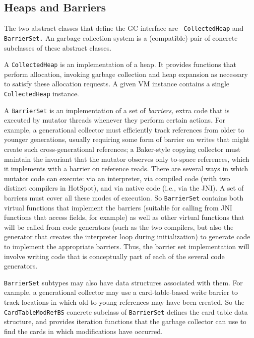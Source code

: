 \documentclass{article}
\begin{document}
\subsection{Heaps and Barriers}

The two abstract classes that define the GC interface are {\tt
CollectedHeap} and {\tt BarrierSet.}
An garbage collection system is a (compatible) pair of concrete
subclasses of these abstract classes. 

A {\tt CollectedHeap} is an implementation of a heap.  It provides
functions that perform allocation, invoking garbage collection and
heap expansion as necessary to satisfy these allocation requests.  A
given VM instance contains a single {\tt CollectedHeap} instance.

A {\tt BarrierSet} is an implementation of a set of {\em barriers,}
extra code that is executed by mutator threads whenever they perform
certain actions.  For example, a generational collector must
efficiently track references from older to younger generations, usually
requiring some form of barrier on writes that
might create such cross-generational references; a Baker-style copying
collector must maintain 
the invariant that the mutator observes only to-space references, which
it implements with a barrier on reference reads.  There are several ways
in which mutator code can execute: via an interpreter, via compiled
code (with two distinct compilers in HotSpot), and via native code
(i.e., via the JNI).  A set of barriers must cover all these modes of
execution.  So {\tt BarrierSet} contains both virtual functions that
implement the barriers (suitable for calling from JNI functions that
access fields, for example) as well as other virtual functions that
will be called from code generators (such as the two compilers, but
also the generator that creates the interpreter loop during
initialization) to generate code to implement the appropriate
barriers.  Thus, the barrier set implementation will involve writing
code that is conceptually part of each of the several code
generators.

{\tt BarrierSet} subtypes may also have data structures associated
with them.  For example, a generational collector may use a
card-table-based write barrier to track locations in which
old-to-young references may have been created.  So the {\tt
CardTableModRefBS} concrete subclass of {\tt BarrierSet} defines the
card table data structure, and provides iteration functions that the
garbage collector can use to find the cards in which modifications
have occurred.
\end{document}
